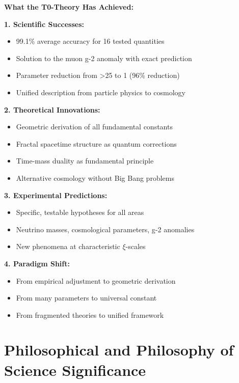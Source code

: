 \documentclass[12pt,a4paper]{article}
\begin{document}
	\begin{overview}
		\textbf{What the T0-Theory Has Achieved:}
		
		\textbf{1. Scientific Successes:}
		\begin{itemize}
			\item 99.1\% average accuracy for 16 tested quantities
			\item Solution to the muon g-2 anomaly with exact prediction
			\item Parameter reduction from >25 to 1 (96\% reduction)
			\item Unified description from particle physics to cosmology
		\end{itemize}
		
		\textbf{2. Theoretical Innovations:}
		\begin{itemize}
			\item Geometric derivation of all fundamental constants
			\item Fractal spacetime structure as quantum corrections
			\item Time-mass duality as fundamental principle
			\item Alternative cosmology without Big Bang problems
		\end{itemize}
		
		\textbf{3. Experimental Predictions:}
		\begin{itemize}
			\item Specific, testable hypotheses for all areas
			\item Neutrino masses, cosmological parameters, g-2 anomalies
			\item New phenomena at characteristic $\xi$-scales
		\end{itemize}
		
		\textbf{4. Paradigm Shift:}
		\begin{itemize}
			\item From empirical adjustment to geometric derivation
			\item From many parameters to universal constant
			\item From fragmented theories to unified framework
		\end{itemize}
	\end{overview}
	
	
	\section{Philosophical and Philosophy of Science Significance}
	
\end{document}

